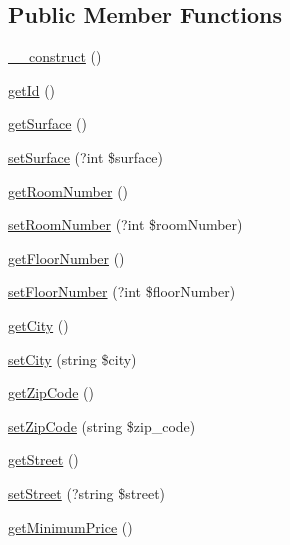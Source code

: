 \subsection*{Public Member Functions}
\begin{DoxyCompactItemize}
\item 
\mbox{\hyperlink{class_app_1_1_entity_1_1_possession_a095c5d389db211932136b53f25f39685}{\+\_\+\+\_\+construct}} ()
\item 
\mbox{\hyperlink{class_app_1_1_entity_1_1_possession_a12251d0c022e9e21c137a105ff683f13}{get\+Id}} ()
\item 
\mbox{\hyperlink{class_app_1_1_entity_1_1_possession_a282b0af88968ac8e268c0f21cdf5f034}{get\+Surface}} ()
\item 
\mbox{\hyperlink{class_app_1_1_entity_1_1_possession_a0cc7d745f571f40e9bc6a30bfece6159}{set\+Surface}} (?int \$surface)
\item 
\mbox{\hyperlink{class_app_1_1_entity_1_1_possession_a28200e288472aeb29690a46b55956cec}{get\+Room\+Number}} ()
\item 
\mbox{\hyperlink{class_app_1_1_entity_1_1_possession_a15a22e1c845fbd522c7a0b5242de22c0}{set\+Room\+Number}} (?int \$room\+Number)
\item 
\mbox{\hyperlink{class_app_1_1_entity_1_1_possession_ad96dd8e887accad18d821d3dec0d033b}{get\+Floor\+Number}} ()
\item 
\mbox{\hyperlink{class_app_1_1_entity_1_1_possession_a058ccd474eb4882631b4011d6807c90b}{set\+Floor\+Number}} (?int \$floor\+Number)
\item 
\mbox{\hyperlink{class_app_1_1_entity_1_1_possession_ae9ca906fce6e9fe5fab3a6b42209d6a1}{get\+City}} ()
\item 
\mbox{\hyperlink{class_app_1_1_entity_1_1_possession_af5d7dc38965353521a771e7ea053d2ef}{set\+City}} (string \$city)
\item 
\mbox{\hyperlink{class_app_1_1_entity_1_1_possession_a57a82c7e2cc6a5009844b8a9a9995e93}{get\+Zip\+Code}} ()
\item 
\mbox{\hyperlink{class_app_1_1_entity_1_1_possession_a38974ca863b9f65abf0d5cf642688eb0}{set\+Zip\+Code}} (string \$zip\+\_\+code)
\item 
\mbox{\hyperlink{class_app_1_1_entity_1_1_possession_ad804bd3a7447b83b37d6de35f2056fb2}{get\+Street}} ()
\item 
\mbox{\hyperlink{class_app_1_1_entity_1_1_possession_a50fcef04f17ffeb002082b4e4d54193a}{set\+Street}} (?string \$street)
\item 
\mbox{\hyperlink{class_app_1_1_entity_1_1_possession_a25d2aecd8053b66c953a617b41fe3739}{get\+Minimum\+Price}} ()

\end{DoxyCompactItemize}
